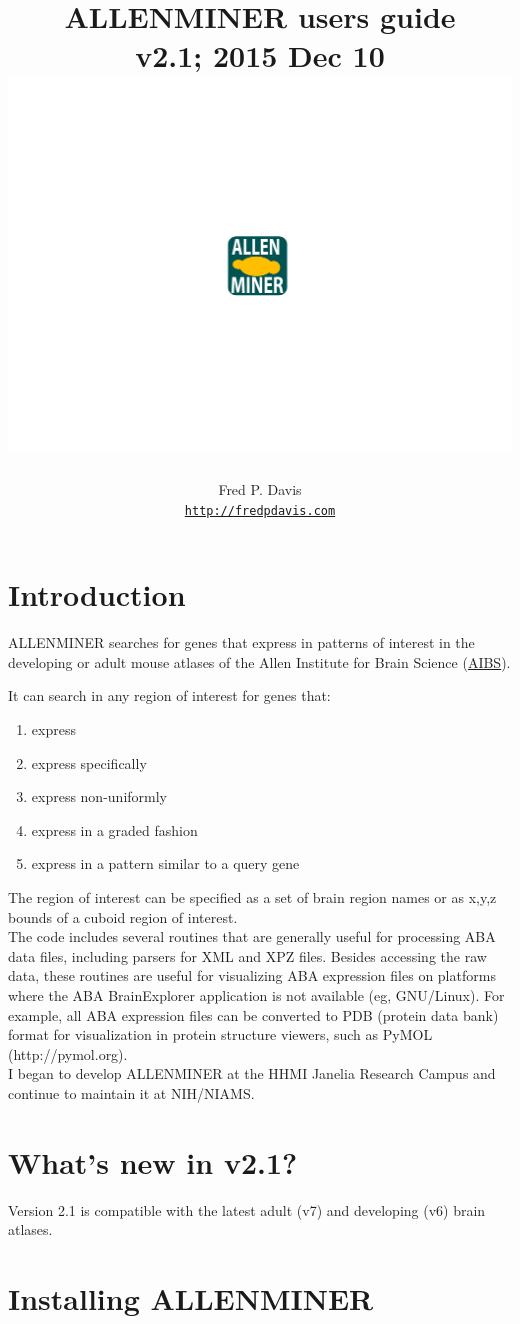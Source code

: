 \documentclass[10pt]{article}
\title{ALLENMINER users guide\\v2.1; 2015 Dec 10\\
\includegraphics[bb=279 200 355 276,scale=0.6]{allenminer_logo.pdf}}
\author{Fred P. Davis\\{\tt \href{http://fredpdavis.com}{http://fredpdavis.com}}}
\begin{document}
\maketitle

\section*{Introduction}
ALLENMINER searches for genes that express in patterns of interest in the developing or adult mouse atlases of the Allen Institute for Brain Science (\href{http://www.alleninstitute.org}{AIBS}).

It can search in any region of interest for genes that:
\begin{enumerate}
\item express
\item express specifically
\item express non-uniformly
\item express in a graded fashion
\item express in a pattern similar to a query gene
\end{enumerate}

The region of interest can be specified as a set of brain region names or as
x,y,z bounds of a cuboid region of interest.\\

The code includes several routines that are generally useful for processing ABA
data files, including parsers for XML and XPZ files. Besides accessing the
raw data, these routines are useful for visualizing ABA expression files on
platforms where the ABA BrainExplorer application is not available (eg,
GNU/Linux). For example, all ABA expression files can be converted to PDB
(protein data bank) format for visualization in protein structure viewers, such
as PyMOL (http://pymol.org).\\

I began to develop ALLENMINER at the HHMI Janelia Research Campus and continue
to maintain it at NIH/NIAMS.


\section*{What's new in v2.1?}
Version 2.1 is compatible with the latest adult (v7) and developing (v6) brain atlases.

\tableofcontents

\section{Installing ALLENMINER}
\end{document}
